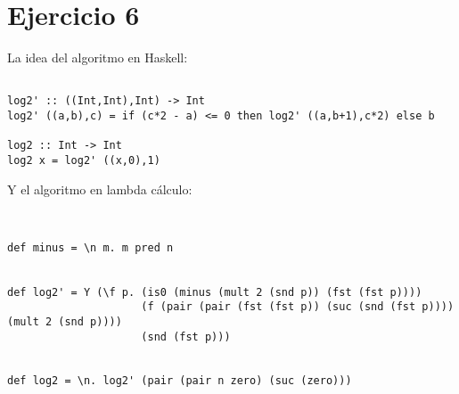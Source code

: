 \documentclass[a4paper]{article}
\begin{document}
\section*{Ejercicio 6}

La idea del algoritmo en Haskell:
\begin{verbatim}

log2' :: ((Int,Int),Int) -> Int
log2' ((a,b),c) = if (c*2 - a) <= 0 then log2' ((a,b+1),c*2) else b

log2 :: Int -> Int
log2 x = log2' ((x,0),1)

\end{verbatim}

Y el algoritmo en lambda c\'alculo:

\begin{verbatim}


def minus = \n m. m pred n


def log2' = Y (\f p. (is0 (minus (mult 2 (snd p)) (fst (fst p))))
                     (f (pair (pair (fst (fst p)) (suc (snd (fst p)))) (mult 2 (snd p))))
                     (snd (fst p)))


def log2 = \n. log2' (pair (pair n zero) (suc (zero)))

\end{verbatim}
\end{document}
